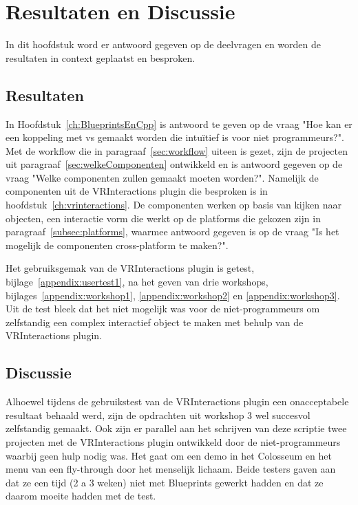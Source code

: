 \chapter{Resultaten en Discussie}
\label{ch:resultatenEnDiscussie}

In dit hoofdstuk word er antwoord gegeven op de deelvragen en worden de resultaten in context geplaatst en besproken.

\section{Resultaten}
In Hoofdstuk~\ref{ch:BlueprintsEnCpp} is antwoord te geven op de vraag "Hoe kan er een koppeling met \gls{vs} gemaakt worden die intuïtief is voor niet programmeurs?". Met de workflow die in paragraaf~\ref{sec:workflow} uiteen is gezet, zijn de projecten uit paragraaf~\ref{sec:welkeComponenten} ontwikkeld en is antwoord gegeven op de vraag "Welke componenten zullen gemaakt moeten worden?". Namelijk de componenten uit de VRInteractions plugin die besproken is in hoofdstuk~\ref{ch:vrinteractions}. De componenten werken op basis van kijken naar objecten, een interactie vorm die werkt op de platforms die gekozen zijn in paragraaf~\ref{subsec:platforms}, waarmee antwoord gegeven is op de vraag "Is het mogelijk de componenten cross-platform te maken?".

Het gebruiksgemak van de VRInteractions plugin is getest, bijlage~\ref{appendix:usertest1}, na het geven van drie workshops, bijlages~\ref{appendix:workshop1}, \ref{appendix:workshop2} en \ref{appendix:workshop3}. Uit de test bleek dat het niet mogelijk was voor de niet-programmeurs om zelfstandig een complex interactief object te maken met behulp van de VRInteractions plugin.

\section{Discussie}
Alhoewel tijdens de gebruikstest van de VRInteractions plugin een onacceptabele resultaat behaald werd, zijn de opdrachten uit workshop 3 wel succesvol zelfstandig gemaakt. Ook zijn er parallel aan het schrijven van deze scriptie twee projecten met de VRInteractions plugin ontwikkeld door de niet-programmeurs waarbij geen hulp nodig was. Het gaat om een demo in het Colosseum en het menu van een fly-through door het menselijk lichaam. Beide testers gaven aan dat ze een tijd (2 a 3 weken) niet met Blueprints gewerkt hadden en dat ze daarom moeite hadden met de test. 

